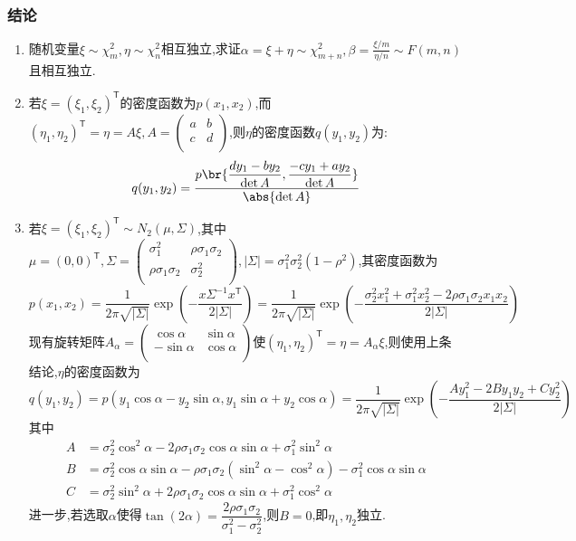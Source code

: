 \documentclass{article}
\newcommand{\T}{\mathsf{T}}
\theoremstyle{definition}
\begin{document}
\subsubsection{结论}
\begin{enumerate}
    \item 随机变量$\xi\sim\chi^2_m,\eta\sim\chi^2_n$相互独立,求证$\alpha=\xi+\eta\sim\chi^2_{m+n},\beta=\frac{\xi/m}{\eta/n}\sim F(m,n)$且相互独立.
    \item 若$\xi=(\xi_1,\xi_2)^\T$的密度函数为$p(x_1,x_2)$,而$(\eta_1,\eta_2)^\T=\eta=A\xi, A=\begin{pmatrix}a&b\\c&d\\ \end{pmatrix}$,则$\eta$的密度函数$q(y_1,y_2)$为:
    $$q(y_1,y_2)=\frac{p\br{\dfrac{dy_1-by_2}{\det A},\dfrac{-cy_1+ay_2}{\det A}}}{\abs{\det A}}$$
    \item 若$\xi=(\xi_1,\xi_2)^\T\sim N_2(\mu,\Sigma)$,其中$\mu=(0,0)^\T,\Sigma=\begin{pmatrix}\sigma_1^2&\rho\sigma_1\sigma_2\\\rho\sigma_1\sigma_2&\sigma_2^2\\ \end{pmatrix}, |\Sigma|=\sigma_1^2\sigma_2^2(1-\rho^2)$,其密度函数为
    $$p(x_1,x_2)=\frac{1}{2\pi\sqrt{|\Sigma|}}\exp\left(-\frac{x\Sigma^{-1}x^\T}{2|\Sigma|}\right)=\frac{1}{2\pi\sqrt{|\Sigma|}}\exp\left(-\frac{\sigma_2^2 x_1^2+\sigma_1^2 x_2^2-2\rho\sigma_1 \sigma_2 x_1 x_2}{2|\Sigma|}\right)$$
    现有旋转矩阵$A_\alpha=\begin{pmatrix}\cos\alpha&\sin\alpha\\-\sin\alpha&\cos\alpha\\ \end{pmatrix}$使$(\eta_1,\eta_2)^\T=\eta=A_\alpha \xi$,则使用上条结论,$\eta$的密度函数为
    $$q(y_1,y_2)=p(y_1\cos\alpha-y_2\sin\alpha,y_1\sin\alpha+y_2\cos\alpha)=\frac{1}{2\pi \sqrt{|\Sigma|}}\exp\left(-\frac{Ay_1^2-2By_1y_2+Cy_2^2}{2|\Sigma|}\right)$$
    其中$$\begin{aligned}
        A&=\sigma_2^2\cos^2\alpha-2\rho\sigma_1\sigma_2\cos\alpha\sin\alpha+\sigma_1^2\sin^2\alpha\\
        B&=\sigma_2^2\cos\alpha\sin\alpha-\rho\sigma_1\sigma_2(\sin^2\alpha-\cos^2\alpha)-\sigma^2_1\cos\alpha\sin\alpha\\
        C&=\sigma_2^2\sin^2\alpha+2\rho\sigma_1\sigma_2\cos\alpha\sin\alpha+\sigma_1^2\cos^2\alpha
    \end{aligned}$$
    进一步,若选取$\alpha$使得$\tan(2\alpha)=\dfrac{2\rho\sigma_1\sigma_2}{\sigma_1^2-\sigma_2^2}$,则$B=0$,即$\eta_1,\eta_2$独立.
\end{enumerate}
\end{document}
